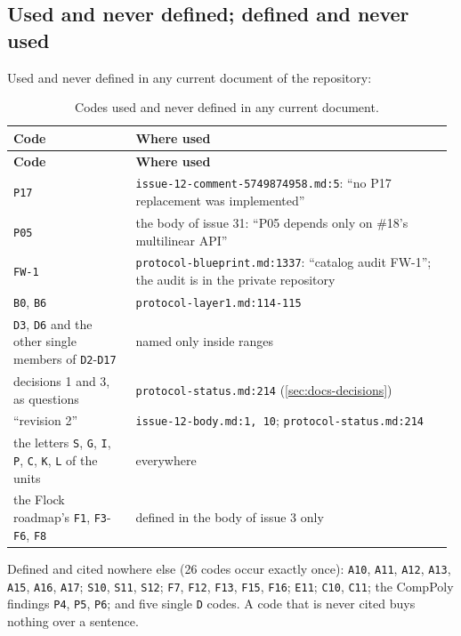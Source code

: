 \subsection{Used and never defined; defined and never used}\label{sec:docs-code-undefined}

Used and never defined in any current document of the repository:

{\footnotesize\setlength{\tabcolsep}{3pt}
\begin{longtable}{@{}>{\raggedright\arraybackslash}p{0.275\linewidth}>{\raggedright\arraybackslash}p{0.708\linewidth}@{}}
\caption{Codes used and never defined in any current document.}\label{tab:docs-code-undefined}\\
\toprule
\textbf{Code} & \textbf{Where used} \\
\midrule
\endfirsthead
\toprule
\textbf{Code} & \textbf{Where used} \\
\midrule
\endhead
\bottomrule
\endfoot
\texttt{P17} & \texttt{issue-\allowbreak{}12-\allowbreak{}comment-\allowbreak{}5749874958.\allowbreak{}md:\allowbreak{}5}: ``no P17 replacement was implemented'' \\\addlinespace[2pt]
\texttt{P05} & the body of issue 31: ``P05 depends only on \#18's multilinear API'' \\\addlinespace[2pt]
\texttt{FW-\allowbreak{}1} & \texttt{protocol-\allowbreak{}blueprint.\allowbreak{}md:\allowbreak{}1337}: ``catalog audit FW-1''; the audit is in the private repository \\\addlinespace[2pt]
\texttt{B0}, \texttt{B6} & \texttt{protocol-\allowbreak{}layer1.\allowbreak{}md:\allowbreak{}114-\allowbreak{}115} \\\addlinespace[2pt]
\texttt{D3}, \texttt{D6} and the other single members of \texttt{D2}-\texttt{D17} & named only inside ranges \\\addlinespace[2pt]
decisions 1 and 3, as questions & \texttt{protocol-\allowbreak{}status.\allowbreak{}md:\allowbreak{}214} (\cref{sec:docs-decisions}) \\\addlinespace[2pt]
``revision 2'' & \texttt{issue-\allowbreak{}12-\allowbreak{}body.\allowbreak{}md:\allowbreak{}1,\allowbreak{} 10}; \texttt{protocol-\allowbreak{}status.\allowbreak{}md:\allowbreak{}214} \\\addlinespace[2pt]
the letters \texttt{S}, \texttt{G}, \texttt{I}, \texttt{P}, \texttt{C}, \texttt{K}, \texttt{L} of the units & everywhere \\\addlinespace[2pt]
the Flock roadmap's \texttt{F1}, \texttt{F3}-\texttt{F6}, \texttt{F8} & defined in the body of issue 3 only \\
\end{longtable}}

\begin{sloppypar}
Defined and cited nowhere else (26 codes occur exactly once): \texttt{A10}, \texttt{A11}, \texttt{A12}, \texttt{A13}, \texttt{A15}, \texttt{A16}, \texttt{A17}; \texttt{S10}, \texttt{S11}, \texttt{S12}; \texttt{F7}, \texttt{F12}, \texttt{F13}, \texttt{F15}, \texttt{F16}; \texttt{E11}; \texttt{C10}, \texttt{C11}; the CompPoly findings \texttt{P4}, \texttt{P5}, \texttt{P6}; and five single \texttt{D} codes. A code that is never cited buys nothing over a sentence.
\end{sloppypar}
